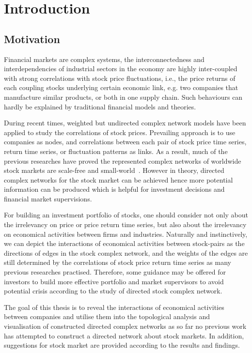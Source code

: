 \chapter{Introduction}
\section{Motivation}
Financial markets are complex systems, the interconnectedness and interdependencies of industrial sectors in the economy are highly inter-coupled with strong correlations with stock price fluctuations, i.e., the price returns of each coupling stocks underlying certain economic link, e.g. two companies that manufacture similar products, or both in one supply chain. Such behaviours can hardly be explained by traditional financial models and theories.

During recent times, weighted but undirected complex network models have been applied to study the correlations of stock prices. Prevailing approach is to use companies as nodes, and correlations between each pair of stock price time series, return time series, or fluctuation patterns as links. As a result, much of the previous researches have proved the represented complex networks of worldwide stock markets are scale-free and small-world~\cite{cnsm, perspective}. However in theory, directed complex networks for the stock market can be achieved hence more potential information can be produced which is helpful for investment decisions and financial market supervisions.

For building an investment portfolio of stocks, one should consider not only about the irrelevancy on price or price return time series, but also about the irrelevancy on economical activities between firms and industries. Naturally and instinctively, we can depict the interactions of economical activities between stock-pairs as the directions of edges in the stock complex network, and the weights of the edges are still determined by the correlations of stock price return time series as many previous researches practised. Therefore, some guidance may be offered for investors to build more effective portfolio and market supervisors to avoid potential crisis according to the study of directed stock complex network.


The goal of this thesis is to reveal the interactions of economical activities between companies and utilise them into the topological analysis and visualisation of constructed directed complex networks as so far no previous work has attempted to construct a directed network about stock markets. In addition, suggestions for stock market are provided according to the results and findings.

